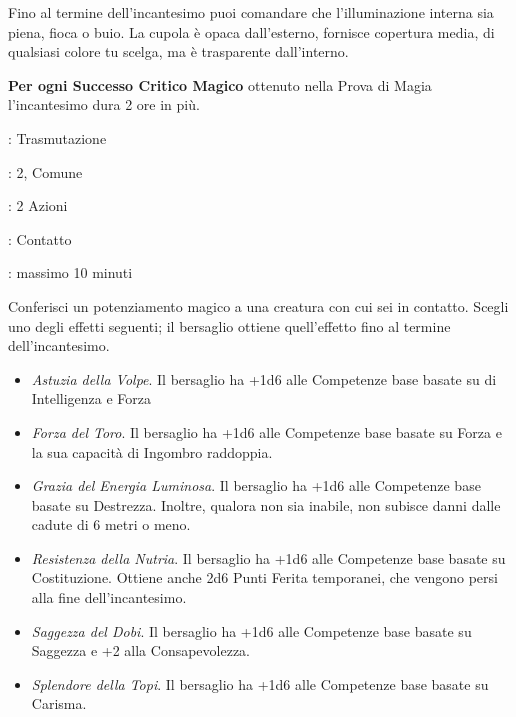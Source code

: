 \begin{multicols}{2}
Fino al termine dell'incantesimo puoi comandare che l'illuminazione interna sia piena, fioca o buio. La cupola è opaca dall'esterno, fornisce copertura media, di qualsiasi colore tu scelga, ma è trasparente dall'interno.

\textbf{Per ogni Successo Critico Magico} ottenuto nella Prova di Magia l'incantesimo dura 2 ore in più.

\noindent\colorbox{OBSSgold!10}{
\begin{minipage}{0.95\linewidth}
\begin{description}[noitemsep, topsep=0pt, parsep=0pt, partopsep=0pt, leftmargin=0cm, labelwidth=1.3cm]
	\item[\textbf{Lista}]: Trasmutazione
	\item[\textbf{Livello}]: 2, Comune
	\item[\textbf{Lancio}]: 2 Azioni
	\item[\textbf{Gittata}]: Contatto
	\item[\textbf{Durata}]: massimo 10 minuti
\end{description}
\end{minipage}}\smallskip

Conferisci un potenziamento magico a una creatura con cui sei in contatto. Scegli uno degli effetti seguenti; il bersaglio ottiene quell'effetto fino al termine dell'incantesimo.

\begin{itemize}[leftmargin=*] \setlength{\itemsep}{0pt}
	\item \emph{Astuzia della Volpe}. Il bersaglio ha +1d6 alle Competenze base basate su di Intelligenza e Forza
	\item \emph{Forza del Toro}. Il bersaglio ha +1d6 alle Competenze base basate su Forza e la sua capacità di Ingombro raddoppia.
	\item \emph{Grazia del Energia Luminosa}. Il bersaglio ha +1d6 alle Competenze base basate su Destrezza. Inoltre, qualora non sia inabile, non subisce danni dalle cadute di 6 metri o meno.
	\item \emph{Resistenza della Nutria}. Il bersaglio ha +1d6 alle Competenze base basate su  Costituzione. Ottiene anche 2d6 Punti Ferita temporanei, che vengono persi alla fine dell'incantesimo.
	\item \emph{Saggezza del Dobi}. Il bersaglio ha +1d6 alle Competenze base basate su  Saggezza e +2 alla Consapevolezza.
	\item \emph{Splendore della Topi}. Il bersaglio ha +1d6 alle Competenze base basate su  Carisma.
\end{itemize}


\end{multicols}
